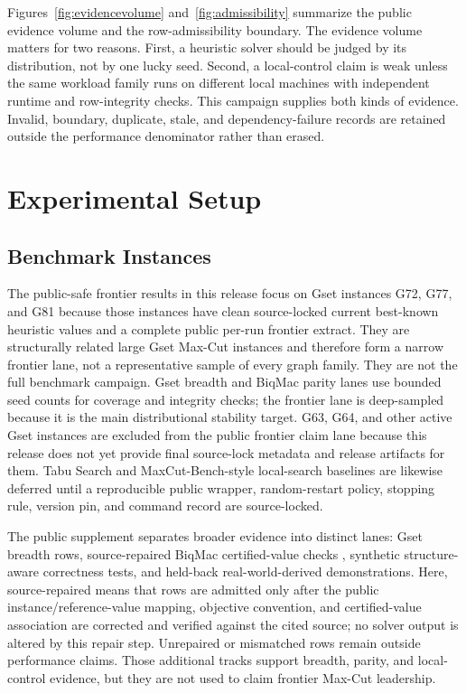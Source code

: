 \documentclass[11pt]{article}
\begin{document}
\noindent Figures~\ref{fig:evidencevolume} and~\ref{fig:admissibility} summarize the public evidence volume and the row-admissibility boundary. The evidence volume matters for two reasons. First, a heuristic solver should be judged by its distribution, not by one lucky seed. Second, a local-control claim is weak unless the same workload family runs on different local machines with independent runtime and row-integrity checks. This campaign supplies both kinds of evidence. Invalid, boundary, duplicate, stale, and dependency-failure records are retained outside the performance denominator rather than erased.

\section{Experimental Setup}
\subsection{Benchmark Instances}
The public-safe frontier results in this release focus on Gset instances G72, G77, and G81 because those instances have clean source-locked current best-known heuristic values and a complete public per-run frontier extract. They are structurally related large Gset Max-Cut instances and therefore form a narrow frontier lane, not a representative sample of every graph family. They are not the full benchmark campaign. Gset breadth and BiqMac parity lanes use bounded seed counts for coverage and integrity checks; the frontier lane is deep-sampled because it is the main distributional stability target. G63, G64, and other active Gset instances are excluded from the public frontier claim lane because this release does not yet provide final source-lock metadata and release artifacts for them. Tabu Search and MaxCut-Bench-style local-search baselines are likewise deferred until a reproducible public wrapper, random-restart policy, stopping rule, version pin, and command record are source-locked.

The public supplement separates broader evidence into distinct lanes: Gset breadth rows, source-repaired BiqMac certified-value checks \cite{biqmac}, synthetic structure-aware correctness tests, and held-back real-world-derived demonstrations. Here, source-repaired means that rows are admitted only after the public instance/reference-value mapping, objective convention, and certified-value association are corrected and verified against the cited source; no solver output is altered by this repair step. Unrepaired or mismatched rows remain outside performance claims. Those additional tracks support breadth, parity, and local-control evidence, but they are not used to claim frontier Max-Cut leadership.
\end{document}
